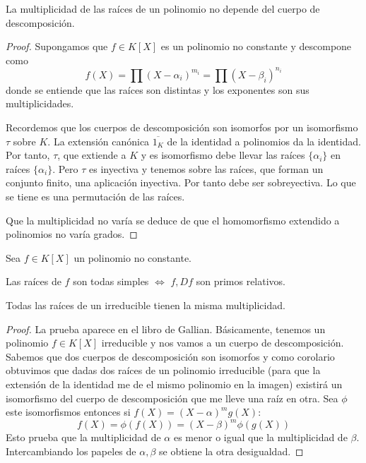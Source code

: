 \begin{proposition}
La multiplicidad de las raíces de un polinomio no depende del cuerpo de descomposición. 
\end{proposition}
\begin{proof}
Supongamos que $f \in K[X]$ es un polinomio no constante y descompone como $$f(X) = \prod (X - \alpha_i)^{m_i} = \prod (X - \beta_i)^{n_i}$$ donde se entiende que las raíces son distintas y los exponentes son sus multiplicidades. 

Recordemos que los cuerpos de descomposición son isomorfos por un isomorfismo $\tau$ sobre $K$. La extensión canónica $\overline{1_K}$ de la identidad a polinomios da la identidad. Por tanto, $\tau$, que extiende a $K$ y es isomorfismo debe llevar las raíces $\{\alpha_i \}$ en raíces $\{\alpha_i \}$. Pero $\tau$ es inyectiva y tenemos sobre las raíces, que forman un conjunto finito, una aplicación inyectiva. Por tanto debe ser sobreyectiva. Lo que se tiene es una permutación de las raíces. 

Que la multiplicidad no varía se deduce de que el homomorfismo extendido a polinomios no varía grados. 
\end{proof}


\begin{lemma}
Sea $f \in K[X]$ un polinomio no constante. 

Las raíces de $f$ son todas simples $\iff$ $f,Df$ son primos relativos. 
\end{lemma}

\begin{lemma}
Todas las raíces de un irreducible tienen la misma multiplicidad.
\end{lemma}
\begin{proof}
La prueba aparece en el libro de Gallian. Básicamente, tenemos un polinomio $f \in K[X]$ irreducible y nos vamos a un cuerpo de descomposición. Sabemos que dos cuerpos de descomposición son isomorfos y como corolario obtuvimos que dadas dos raíces de un polinomio irreducible (para que la extensión de la identidad me de el mismo polinomio en la imagen) existirá un isomorfismo del cuerpo de descomposición que me lleve una raíz en otra. Sea $\phi$ este isomorfismos entonces si $f(X) = (X-\alpha)^mg(X)$: $$f(X) = \phi(f(X)) = (X - \beta)^m \phi(g(X))$$ Esto prueba que la multiplicidad de $\alpha$ es menor o igual que la multiplicidad de $\beta$. Intercambiando los papeles de $\alpha, \beta$ se obtiene la otra desigualdad. 
\end{proof}

